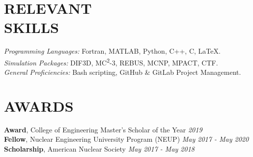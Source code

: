 \documentclass[margin, 10pt]{res}
\begin{document}
\begin{resume}

\section{RELEVANT \\ SKILLS}

{\sl Programming Languages:} Fortran, MATLAB, Python, C++, C, \LaTeX. \\
{\sl Simulation Packages:} DIF3D, MC\textsuperscript{2}-3, REBUS, MCNP, MPACT, 
  CTF. \\
{\sl General Proficiencies:} Bash scripting, GitHub \& GitLab Project 
  Management.

\section{AWARDS}
\textbf{Award}, College of Engineering Master's Scholar of the Year 
  \hfill \textit{2019} \\
\textbf{Fellow}, Nuclear Engineering University Program (NEUP) \hfill 
  \textit{May 2017 - May 2020} \\
\textbf{Scholarship}, American Nuclear Society \hfill 
  \textit{May 2017 - May 2018}

\end{resume}
\end{document}
